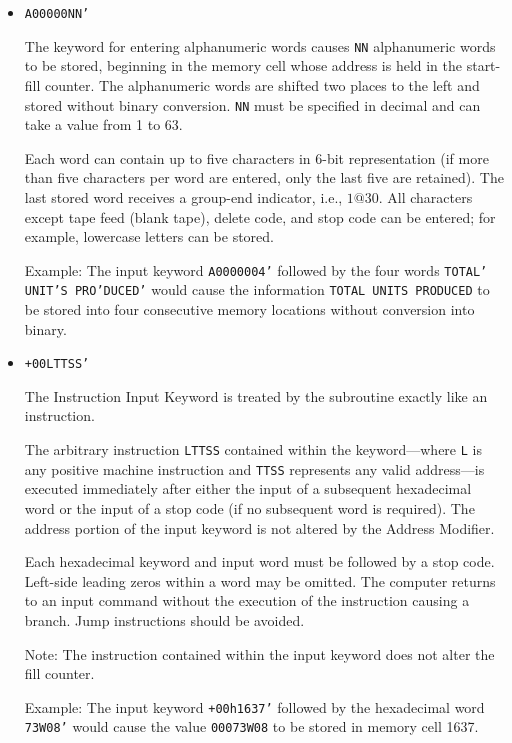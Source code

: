 \documentclass{article}
\begin{document}
\begin{enumerate}
\begin{itemize}
Example: The input keyword \texttt{,0000003'} followed by the three hexadecimal words \texttt{-2'JK73''} would cause the values \texttt{00000002}, \texttt{0000JK73}, and \texttt{00000000} to be stored into the next three consecutive cells.

\item \texttt{A00000NN'}

The keyword for entering alphanumeric words causes \texttt{NN} alphanumeric words to be stored, beginning in the memory cell whose address is held in the start-fill counter. The alphanumeric words are shifted two places to the left and stored without binary conversion. \texttt{NN} must be specified in decimal and can take a value from 1 to 63.

Each word can contain up to five characters in 6-bit representation (if more than five characters per word are entered, only the last five are retained). The last stored word receives a group-end indicator, i.e., $1@30$. All characters except tape feed (blank tape), delete code, and stop code can be entered; for example, lowercase letters can be stored.

Example: The input keyword \texttt{A0000004'} followed by the four words \texttt{TOTAL' UNIT'S PRO'DUCED'} would cause the information \texttt{TOTAL UNITS PRODUCED} to be stored into four consecutive memory locations without conversion into binary.

\item \texttt{+00LTTSS'}

The Instruction Input Keyword is treated by the subroutine exactly like an instruction.

The arbitrary instruction \texttt{LTTSS} contained within the keyword—where \texttt{L} is any positive machine instruction and \texttt{TTSS} represents any valid address—is executed immediately after either the input of a subsequent hexadecimal word or the input of a stop code (if no subsequent word is required). The address portion of the input keyword is not altered by the Address Modifier.

Each hexadecimal keyword and input word must be followed by a stop code. Left-side leading zeros within a word may be omitted. The computer returns to an input command without the execution of the instruction causing a branch. Jump instructions should be avoided.

Note: The instruction contained within the input keyword does not alter the fill counter.

Example: The input keyword \texttt{+00h1637'} followed by the hexadecimal word \texttt{73W08'} would cause the value \texttt{00073W08} to be stored in memory cell 1637.


\end{itemize}
\end{enumerate}
\end{document}
